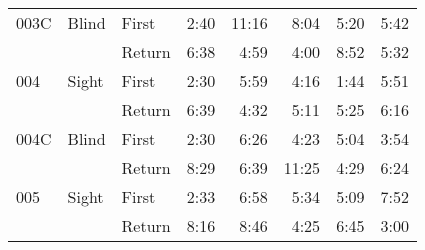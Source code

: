 \begin{table}[!htb]
\begin{tabular}{lllrrrrr}
003C & Blind & First &   2:40 &  11:16 &                                                  8:04 &                                                   5:20 &    5:42 \\
    &       & Return &   6:38 &   4:59 &                                                  4:00 &                                                   8:52 &    5:32 \\
004 & Sight & First &   2:30 &   5:59 &                                                  4:16 &                                                   1:44 &    5:51 \\
    &       & Return &   6:39 &   4:32 &                                                  5:11 &                                                   5:25 &    6:16 \\
004C & Blind & First &   2:30 &   6:26 &                                                  4:23 &                                                   5:04 &    3:54 \\
    &       & Return &   8:29 &   6:39 &                                                 11:25 &                                                   4:29 &    6:24 \\
005 & Sight & First &   2:33 &   6:58 &                                                  5:34 &                                                   5:09 &    7:52 \\
    &       & Return &   8:16 &   8:46 &                                                  4:25 &                                                   6:45 &    3:00 \\
\bottomrule
\end{tabular}
\end{table}

